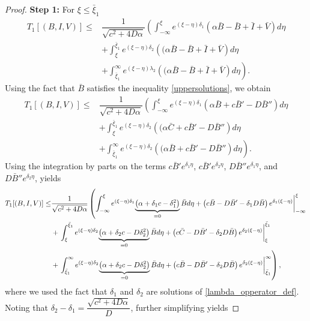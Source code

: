 \documentclass[11pt]{article}
\theoremstyle{definition}
\begin{document}
{\begin{proof}
\textbf{Step 1:} 
For $\xi \le \bar{\xi}_1$  \begin{align}
        T_1[(B,I,V)] \le & \dfrac{1}{\sqrt{c^2+4D \alpha}} \left( \int_{-\infty}^{\xi} e^{(\xi- \eta)\delta_1} {\left(\alpha \bar B-\bar B+\bar I+\bar V \right)}d \eta \right. \\ & + \left. \int_{\xi}^{\bar{\xi}_1} e^{(\xi- \eta)\delta_2} {\left((\alpha \bar  B-\bar B+\bar I+\bar V\right)}d \eta \right. \\&+ \left. \int_{\bar\xi_1}^{\infty} e^{(\xi- \eta)\lambda_2} {\left((\alpha \bar  B-\bar B+\bar I+\bar V\right)}d \eta \right).
    \end{align}
Using the fact that $\bar{B}$ satisfies the inequality \eqref{uppersolutions}, we obtain 
\begin{align}
        T_1[(B,I,V)] \le & \dfrac{1}{\sqrt{c^2+4D \alpha}} \left( \int_{-\infty}^{\xi} e^{(\xi- \eta)\delta_1} {\left(\alpha \bar B+ c\bar B'-D\bar B'' \right)}d \eta \right. \\ & + \left. \int_{\xi}^{\bar{\xi}_1} e^{(\xi- \eta)\delta_2} {\left((\alpha \bar C+ c\bar B'-D\bar B'' \right)}d \eta \right. \\&+ \left. \int_{\bar\xi_1}^{\infty} e^{(\xi- \eta)\delta_2} {\left((\alpha \bar B+ c\bar B'-D\bar B'' \right)}d \eta \right) .\end{align}
Using the integration by parts on the terms $c \bar{B}'e^{\delta_1\eta}$, $c \bar{B}'e^{\delta_2\eta}$, $D \bar{B}''e^{\delta_1\eta}$, and $D \bar{B}''e^{\delta_2\eta}$, yields \begin{align}
        T_1[(B,I,V)] \le & \dfrac{1}{\sqrt{c^2+4D \alpha}} \left( \int_{-\infty}^{\xi} e^{(\xi- \eta)\delta_1} {\underbrace{\left(\alpha + \delta_1 c- \delta^2_1 \right)}_{=0}\bar{B}}d\eta + \left(c \bar{B}- D \bar B' - \delta_1 D \bar{B} \right) e^{\delta_1(\xi- \eta)}\bigg{|}^\xi_{- \infty}  \right. \\ & + \left. \int_{\xi}^{\bar{\xi}_1} e^{(\xi- \eta)\delta_2} {\underbrace{\left(\alpha + \delta_2 c-D \delta^2_2 \right)}_{=0}\bar{B}}d\eta + \left(c \bar{C}- D \bar B' - \delta_2 D \bar{B} \right) e^{\delta_2(\xi- \eta)}\bigg{|}^{\bar{\xi}_1}_{ \xi}  \right. \\&+ \left. \int_{\bar\xi_1}^{\infty} e^{(\xi- \eta)\delta_2} {\underbrace{\left(\alpha + \delta_2 c-D \delta^2_2 \right)}_{=0}\bar{B}}d\eta + \left(c \bar{B}- D \bar B ' - \delta_2 D \bar{B}\right) e^{\delta_2(\xi- \eta)}\bigg{|}^{\infty}_{ \bar\xi_1} \right), \end{align}
where we used the fact that $\delta_1$ and $\delta_2$ are solutions of \eqref{lambda_opperator_def}. Noting that $\delta_2-\delta_1=\dfrac{\sqrt{c^2+4D\alpha}}{D}$, further simplifying yields 

\end{proof}}
\end{document}
